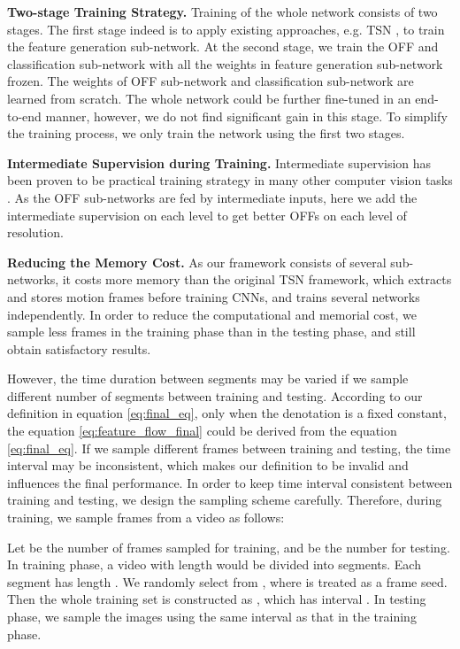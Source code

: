 \documentclass[10pt,twocolumn,letterpaper]{article}
\begin{document}
\textbf{Two-stage Training Strategy.} Training of the whole network consists of two stages. The first stage indeed is to apply existing approaches, e.g. TSN \cite{wang2016tsn}, to train the feature generation sub-network. At the second stage, we train the OFF and classification sub-network with all the weights in feature generation sub-network frozen. The weights of OFF sub-network and classification sub-network are learned from scratch. 
The whole network could be further fine-tuned in an end-to-end manner, however, we do not find significant gain in this stage. To simplify the training process, we only train the network using the first two stages.


\textbf{Intermediate Supervision during Training.} Intermediate supervision has been proven to be practical training strategy in many other computer vision tasks \cite{newell2016hourglass, wei2016cpm, Yangwei_2017_ICCV, Ouyang_2017_ICCV,Chu_2017_CVPR}. As the OFF sub-networks are fed by intermediate inputs, here we add the intermediate supervision on each level to get better OFFs on each level of resolution.







\textbf{Reducing the Memory Cost.} 
As our framework consists of several sub-networks, it costs more memory than the original TSN framework, which extracts and stores motion frames before training CNNs, and trains several networks independently. In order to reduce the computational and memorial cost, we sample less frames in the training phase than in the testing phase, and still obtain satisfactory results. 


However, the time duration between segments may be varied if we sample different number of segments between training and testing. According to our definition in equation \ref{eq:final_eq}, only when the denotation  is a fixed constant, the equation \ref{eq:feature_flow_final} could be derived from the equation \ref{eq:final_eq}. If we sample different frames between training and testing, the time interval  may be inconsistent, which makes our definition to be invalid and influences the final performance. In order to keep time interval consistent between training and testing, we design the sampling scheme carefully. Therefore, during training, we sample frames from a video as follows:

Let  be the number of frames sampled for training, and  be the number for testing. In training phase, a video with length  would be divided into  segments. Each segment has length . We randomly select  from , where  is treated as a frame seed. Then the whole training set is constructed as , which has interval . In testing phase,  we sample the images using the same interval  as that in the training phase.
\end{document}
